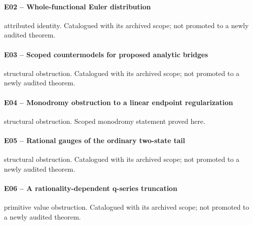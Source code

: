 \paragraph{E02 -- Whole-functional Euler distribution}\label{record-E02}
attributed identity. Catalogued with its archived scope; not promoted to a newly audited theorem.
\par\smallskip{}\par
\paragraph{E03 -- Scoped countermodels for proposed analytic bridges}\label{record-E03}
structural obstruction. Catalogued with its archived scope; not promoted to a newly audited theorem.
\par\smallskip{}\par
\paragraph{E04 -- Monodromy obstruction to a linear endpoint regularization}\label{record-E04}
structural obstruction. Scoped monodromy statement proved here.
\par\smallskip{}\par
\paragraph{E05 -- Rational gauges of the ordinary two-state tail}\label{record-E05}
structural obstruction. Catalogued with its archived scope; not promoted to a newly audited theorem.
\par\smallskip{}\par
\paragraph{E06 -- A rationality-dependent q-series truncation}\label{record-E06}
primitive value obstruction. Catalogued with its archived scope; not promoted to a newly audited theorem.
\par\smallskip{}\par
